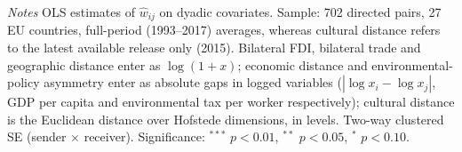 \begin{table}[htbp]
   \par \raggedright 
   \textit{Notes} OLS estimates of $\hat w_{ij}$ on dyadic covariates. Sample: 702 directed pairs, 27 EU countries, full-period (1993--2017) averages, whereas cultural distance refers to the latest available release only (2015). Bilateral FDI, bilateral trade and geographic distance enter as $\log(1+x)$; economic distance and environmental-policy asymmetry enter as absolute gaps in logged variables ($|\log x_i - \log x_j|$, GDP per capita and environmental tax per worker respectively); cultural distance is the Euclidean distance over Hofstede dimensions, in levels. Two-way clustered SE (sender $\times$ receiver). Significance: $^{***}$ $p<0.01$, $^{**}$ $p<0.05$, $^{*}$ $p<0.10$.
\end{table}


